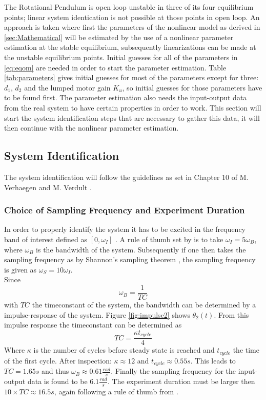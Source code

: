 \documentclass[main.tex]{subfiles}
\begin{document}
	
\vspace{20pt} 
The Rotational Pendulum is open loop unstable in three of its four equilibrium points; linear system identication is not possible at those points in open loop. An approach is taken where first the parameters of the nonlinear model as derived in \ref{sec:Mathematical} will be estimated by the use of a nonlinear parameter estimation at the stable equilibrium, subsequently linearizations can be made at the unstable equilibrium points. Initial guesses for all of the parameters in \ref{eq:eqom} are needed in order to start the parameter estimation. Table \ref{tab:parameters} gives initial guesses for most of the parameters except for three: $d_1$, $d_2$ and the lumped motor gain $K_u$, so initial guesses for those parameters have to be found first. The parameter estimation also needs the input-output data from the real system to have certain properties in order to work. This section will start the system identification steps that are necessary to gather this data, it will then continue with the nonlinear parameter estimation. 

\subsection{System Identification}
The system identification will follow the guidelines as set in Chapter 10 of M. Verhaegen and M. Verdult \cite{Filtering}. 
\subsubsection{Choice of Sampling Frequency and Experiment Duration}
In order to properly identify the system it has to be excited in the frequency band of interest defined as $\left[0,\omega_I\right]$ . A rule of thumb set by \cite{Filtering} is to take $\omega_I=5\omega_B$, where $\omega_B$ is the bandwidth of the system. Subsequently if one then takes the sampling frequency as by Shannon's sampling theorem \cite{Kamen}, the sampling frequency is given as $\omega_S = 10\omega_I$.  \\ Since 
\begin{equation}
\omega_B=\frac{1}{TC}
\end{equation}
with $TC$ the timeconstant of the system, the bandwidth can be determined by a impulse-response of the system. Figure \ref{fig:impulse2} shows $\theta_2(t)$.
From this impulse response the timeconstant can be determined as 
\begin{equation}
TC= \frac{\kappa t_{cycle}}{4}
\end{equation}
Where $\kappa$ is the number of cycles before steady state is reached and $t_{cycle}$ the time of the first cycle. After inspection: $\kappa\approx 12$ and $t_{cycle}\approx 0.55s$. This leads to $TC=1.65s$ and thus $\omega_B\approx0.61\frac{rad}{s}$. Finally the sampling frequency for the input-output data is found to be $6.1\frac{rad}{s}$. The experiment duration must be larger then $10\times TC \approx 16.5s$, again following a rule of thumb from \cite{Filtering}.
\end{document}
